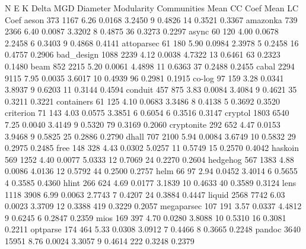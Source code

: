 \documentclass[12pt, a4paper]{article}
\begin{document}
N    E     K     Delta  MGD    Diameter Modularity Communities Mean CC Coef Mean LC Coef
aeson       373  1167  6.26 0.0168 3.2450  9       0.4826      14         0.3521       0.3367      
amazonka    739  2366  6.40 0.0087 3.3202  8       0.4875      36         0.3273       0.2297      
async        60   120  4.00 0.0678 2.2458  6       0.3403       9         0.4868       0.4141      
attoparsec   61   180  5.90 0.0984 2.3978  5       0.2458      16         0.4757       0.2906      
bad_design 1088  2239  4.12 0.0038 4.7322 13       0.6461      63         0.2323       0.1480      
beam        852  2215  5.20 0.0061 4.4898 11       0.6363      37         0.2488       0.2455      
cabal      2294  9115  7.95 0.0035 3.6017 10       0.4939      96         0.2981       0.1915      
co-log       97   159  3.28 0.0341 3.8937  9       0.6203      11         0.3144       0.4594      
conduit     457   875  3.83 0.0084 3.4084  9       0.4621      35         0.3211       0.3221      
containers   61   125  4.10 0.0683 3.3486  8       0.4138       5         0.3692       0.3520      
criterion    71   143  4.03 0.0575 3.3851  6       0.6054       6         0.3516       0.3147      
cryptol    1803  6540  7.25 0.0040 3.4149  9       0.5320      79         0.3169       0.2060      
cryptonite  292   652  4.47 0.0153 3.9468  9       0.5825      25         0.2886       0.2790      
dhall       707  2100  5.94 0.0084 3.6749 10       0.5832      29         0.2975       0.2485      
free        148   328  4.43 0.0302 5.0257 11       0.5749      15         0.2570       0.4042      
haskoin     569  1252  4.40 0.0077 5.0333 12       0.7069      24         0.2270       0.2604      
hedgehog    567  1383  4.88 0.0086 4.0136 12       0.5792      44         0.2500       0.2757      
helm         66    97  2.94 0.0452 3.4014  6       0.5655       4         0.3585       0.4360      
hlint       266   624  4.69 0.0177 3.1839 10       0.4633      40         0.3589       0.3124      
lens       1118  3908  6.99 0.0063 2.7743  7       0.4207      24         0.3884       0.4447      
liquid     2568  7742  6.03 0.0023 3.3709 12       0.3388     419         0.3229       0.2057      
megaparsec  107   191  3.57 0.0337 4.4812  9       0.6245       6         0.2847       0.2359      
mios        169   397  4.70 0.0280 3.8088 10       0.5310      16         0.3081       0.2211      
optparse    174   464  5.33 0.0308 3.0912  7       0.4466       8         0.3665       0.2248      
pandoc     3640 15951  8.76 0.0024 3.3057  9       0.4614     222         0.3248       0.2379      
\end{document}
